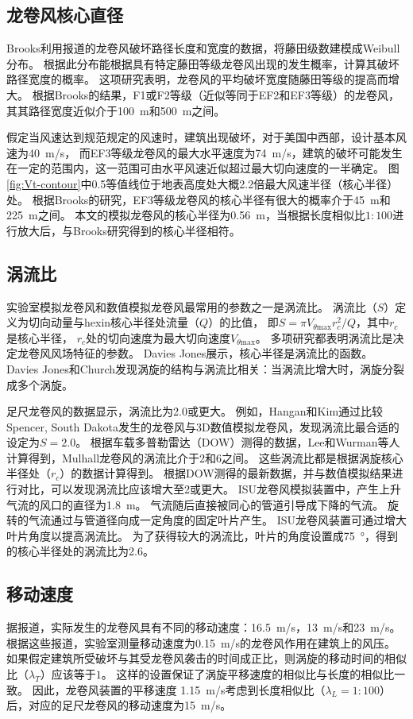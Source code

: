 \documentclass{ctexart}
\begin{document}
\subsection{龙卷风核心直径}
Brooks利用报道的龙卷风破坏路径长度和宽度的数据，将藤田级数建模成Weibull分布。
根据此分布能根据具有特定藤田等级龙卷风出现的发生概率，计算其破坏路径宽度的概率。
这项研究表明，龙卷风的平均破坏宽度随藤田等级的提高而增大。
根据Brooks的结果，F1或F2等级（近似等同于EF2和EF3等级）的龙卷风，其其路径宽度近似介于\SI{100}{m}和\SI{500}{m}之间。

假定当风速达到规范规定的风速时，建筑出现破坏，对于美国中西部，设计基本风速为\SI{40}{m/s}，
而EF3等级龙卷风的最大水平速度为\SI{74}{m/s}，建筑的破坏可能发生在一定的范围内，这一范围可由水平风速近似超过最大切向速度的一半确定。
图\ref{fig:Vt-contour}中0.5等值线位于地表高度处大概2.2倍最大风速半径（核心半径）处。
根据Brooks的研究，EF3等级龙卷风的核心半径有很大的概率介于\SI{45}{m}和\SI{225}{m}之间。
本文的模拟龙卷风的核心半径为\SI{0.56}{m}，当根据长度相似比$1:100$进行放大后，与Brooks研究得到的核心半径相符。

\subsection{涡流比}
实验室模拟龙卷风和数值模拟龙卷风最常用的参数之一是涡流比。
涡流比（$S$）定义为切向动量与hexin核心半径处流量（$Q$）的比值，
即$S=\pi V_{\theta \mathrm{max}}r_c^2/Q$，其中$r_c$是核心半径，
$r_c$处的切向速度为最大切向速度$V_{\theta \mathrm{max}}$。
多项研究都表明涡流比是决定龙卷风风场特征的参数。
Davies Jones展示，核心半径是涡流比的函数。
Davies Jones和Church发现涡旋的结构与涡流比相关：当涡流比增大时，涡旋分裂成多个涡旋。

足尺龙卷风的数据显示，涡流比为\num{2.0}或更大。
例如，Hangan和Kim通过比较Spencer, South Dakota发生的龙卷风与3D数值模拟龙卷风，发现涡流比最合适的设定为$S=2.0$。
根据车载多普勒雷达（DOW）测得的数据，Lee和Wurman等人计算得到，Mulhall龙卷风的涡流比介于\num{2}和\num{6}之间。
这些涡流比都是根据涡旋核心半径处（$r_c$）的数据计算得到。
根据DOW测得的最新数据，并与数值模拟结果进行对比，可以发现涡流比应该增大至\num{2}或更大。
ISU龙卷风模拟装置中，产生上升气流的风口的直径为\SI{1.8}{\meter}。
气流随后直接被同心的管道引导成下降的气流。
旋转的气流通过与管道径向成一定角度的固定叶片产生。
ISU龙卷风装置可通过增大叶片角度以提高涡流比。
为了获得较大的涡流比，叶片的角度设置成\SI{75}{\degree}，得到的核心半径处的涡流比为\num{2.6}。

\subsection{移动速度}
据报道，实际发生的龙卷风具有不同的移动速度：\SI{16.5}{m/s}，\SI{13}{m/s}和\SI{23}{m/s}。
根据这些报道，实验室测量移动速度为\SI{0.15}{m/s}的龙卷风作用在建筑上的风压。
如果假定建筑所受破坏与其受龙卷风袭击的时间成正比，则涡旋的移动时间的相似比（$\lambda_T$）应该等于$1$。
这样的设置保证了涡旋平移速度的相似比与长度的相似比一致。
因此，龙卷风装置的平移速度 \SI{1.15}{m/s}考虑到长度相似比（$\lambda_L=1:100$）后，对应的足尺龙卷风的移动速度为\SI{15}{m/s}。
\end{document}
